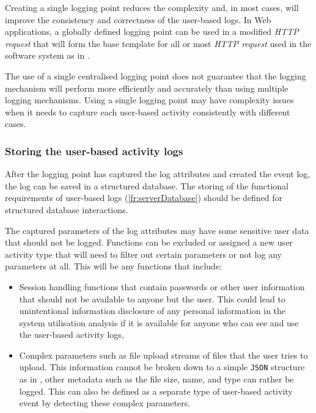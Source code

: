 Creating a single logging point reduces the complexity and, in most cases, will improve the consistency and correctness of the user-based logs. In Web applications, a globally defined logging point can be used in a modified \textit{HTTP request} that will form the base template for all or most \textit{HTTP request} used in the software system as in .\par The use of a single centralised logging point does not guarantee that the logging mechanism will perform more efficiently and accurately than using multiple logging mechanisms. Using a single logging point may have complexity issues when it needs to capture each user-based activity consistently with different cases.

\subsubsection{Storing the user-based activity logs}\label{sec:ch2_databaseStorage}
After the logging point has captured the log attributes and created the event log, the log can be saved in a structured database. The storing of the functional requirements of user-based logs (\ref{fr:serverDatabase}) should be defined for structured database interactions.\par The captured parameters of the log attributes may have some sensitive user data that should not be logged. Functions can be excluded or assigned a new user activity type that will need to filter out certain parameters or not log any parameters at all. This will be any functions that include:

\begin{itemize}
	\item Session handling functions that contain passwords or other user information that should not be available to anyone but the user. This could lead to unintentional information disclosure of any personal information in the system utilisation analysis if it is available for anyone who can see and use the user-based activity logs,
	\item Complex parameters such as file upload streams of files that the user tries to upload. This information cannot be broken down to a simple \texttt{JSON} structure as in , other metadata such as the file size, name, and type can rather be logged. This can also be defined as a separate type of user-based activity event by detecting these complex parameters.
\end{itemize}

